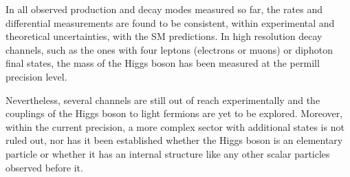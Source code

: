 \documentclass[12pt]{article}
\begin{document}
In all observed production and decay modes measured so far, the rates and differential measurements are found to be consistent, within experimental and theoretical uncertainties, with the SM predictions. In high resolution decay channels, such as the ones with four leptons (electrons or muons) or diphoton final states, the mass of the Higgs boson has been measured at the permill precision level.

Nevertheless, several channels are still out of reach experimentally and the couplings of the Higgs boson to light fermions are yet to be explored. Moreover, within the current precision, a more complex sector with additional states is not ruled out, nor has it been established whether the Higgs boson is an elementary particle or whether it has an internal structure like any other scalar particles observed before it.
\end{document}
